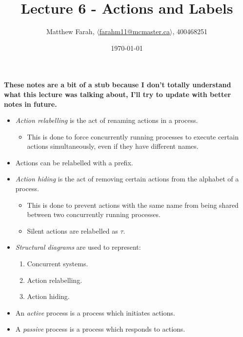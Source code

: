\documentclass{article}
\title{Lecture 6 - Actions and Labels}
\author{Matthew Farah, \href{mailto:farahm11@mcmaster.ca}{$\langle$farahm11@mcmaster.ca$\rangle$}, 400468251}
\date{\today}
\begin{document}
\maketitle
\pagestyle{fancy}

\fi

\begin{center}
\textbf{These notes are a bit of a stub because I don't totally understand what this lecture was talking about, I'll try to update with better notes in future.}\\
\end{center}

\begin{itemize}
	\item \emph{Action relabelling} is the act of renaming actions in a process.
	\begin{itemize}
		\item This is done to force concurrently running processes to execute certain actions simultaneously, even if they have different names.
	\end{itemize}
	\item Actions can be relabelled with a prefix.
	\item \emph{Action hiding} is the act of removing certain actions from the alphabet of a process.
	\begin{itemize}
		\item This is done to prevent actions with the same name from being shared between two concurrently running processes.
		\item Silent actions are relabelled as $\tau$.
	\end{itemize}
	\item \emph{Structural diagrams} are used to represent:
	\begin{enumerate}
		\item Concurrent systems.
		\item Action relabelling.
		\item Action hiding.
	\end{enumerate}
	\item An \emph{active} process is a process which initiates actions.
	\item A \emph{passive} process is a process which responds to actions.
\end{itemize}

\ifdefined\iscombined
	\newpage
\else
	
\end{document}

